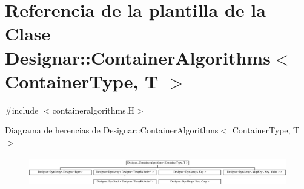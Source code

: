 \hypertarget{class_designar_1_1_container_algorithms}{}\section{Referencia de la plantilla de la Clase Designar\+:\+:Container\+Algorithms$<$ Container\+Type, T $>$}
\label{class_designar_1_1_container_algorithms}


{\ttfamily \#include $<$containeralgorithms.\+H$>$}

Diagrama de herencias de Designar\+:\+:Container\+Algorithms$<$ Container\+Type, T $>$\begin{figure}[H]
\begin{center}
\leavevmode
\includegraphics[height=1.337580cm]{class_designar_1_1_container_algorithms}
\end{center}
\end{figure}
